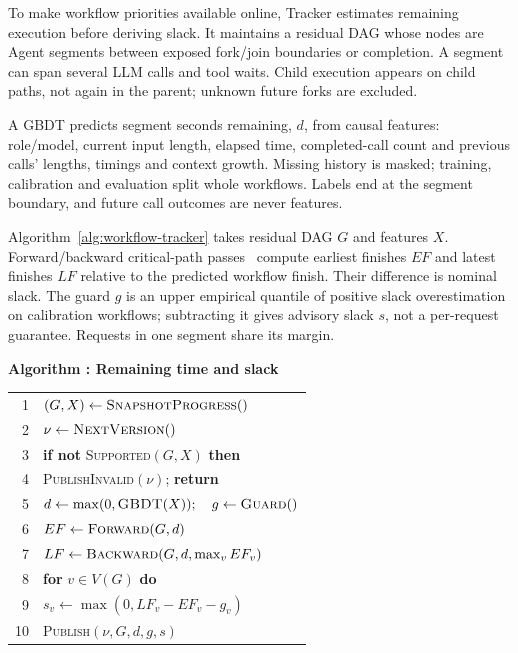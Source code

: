 To make workflow priorities available online, Tracker estimates remaining
execution before deriving slack. It maintains a residual DAG whose nodes
are Agent segments between exposed fork/join boundaries or completion.
A segment can span several LLM calls and tool waits. Child execution
appears on child paths, not again in the parent; unknown future forks
are excluded.

A GBDT predicts segment seconds remaining, $d$, from causal features: role/model,
current input length, elapsed time, completed-call count and previous
calls' lengths, timings and context growth. Missing history is masked;
training, calibration and evaluation split whole workflows. Labels end
at the segment boundary, and future call outcomes are never features.

Algorithm~\ref{alg:workflow-tracker} takes residual DAG $G$ and features
$X$. Forward/backward critical-path passes~\cite{kelley1959cpm} compute
earliest finishes $EF$ and latest finishes $LF$ relative to the predicted
workflow finish. Their difference is nominal slack. The guard $g$ is an
upper empirical quantile of positive slack overestimation on calibration
workflows; subtracting it gives advisory slack $s$, not a per-request
guarantee. Requests in one segment share its margin.

\par\medskip\noindent\begin{minipage}{\columnwidth}
\raggedright
 \label{alg:workflow-tracker}
 \textbf{Algorithm \thedesignalgorithm: Remaining time and slack}
 \par\smallskip
 \begin{tabularx}{\columnwidth}{@{}r@{\quad}X@{}}
 \toprule
 1 & $(G,X)\gets\textsc{SnapshotProgress}()$ \\
 2 & $\nu\gets\textsc{NextVersion}()$ \\
 3 & \textbf{if not} \textsc{Supported}$(G,X)$ \textbf{then} \\
 4 & \quad \textsc{PublishInvalid}$(\nu)$; \textbf{return} \\
 5 & $d\gets\max(0,\textsc{GBDT}(X));\quad g\gets\textsc{Guard}()$ \\
 6 & $EF\gets\textsc{Forward}(G,d)$ \\
 7 & $LF\gets\textsc{Backward}(G,d,\max_v EF_v)$ \\
 8 & \textbf{for} $v\in V(G)$ \textbf{do} \\
 9 & \quad $s_v\gets\max(0,LF_v-EF_v-g_v)$ \\
 10 & \textsc{Publish}$(\nu,G,d,g,s)$ \\
 \bottomrule
 \end{tabularx}
\end{minipage}\par\medskip

